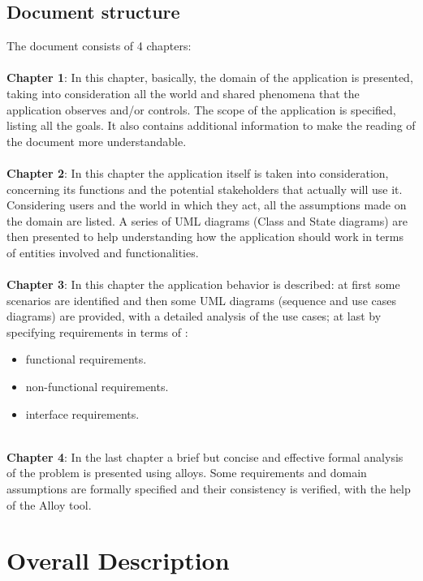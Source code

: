 \documentclass[a4paper]{report}
\begin{document}
\section{Document structure}

The document consists of 4 chapters:
\\ 
\\
\textbf{Chapter 1}: In this chapter, basically, the domain of the application is presented, taking into consideration all the world and shared phenomena that the application observes and/or controls. The scope of the application is specified, listing all the goals.
It also contains additional information to make the reading of the document more understandable.\\ \\
\textbf{Chapter 2}: In this chapter the application itself is taken into consideration, concerning its functions and the potential stakeholders that actually will use it. Considering users and the world in which they act, all the assumptions made on the domain are listed. A series of UML diagrams (Class and State diagrams) are then presented to help understanding how the application should work in terms of entities involved and functionalities.\\ \\
\textbf{Chapter 3}: 
In this chapter the application behavior is described: at first some scenarios are identified and then some UML diagrams (sequence and use cases diagrams) are provided, with a detailed analysis of the use cases; at last by specifying requirements in terms of :
\begin{itemize}
\item functional requirements.
\item non-functional requirements.
\item interface requirements.\\ \\
\end{itemize}
\textbf{Chapter 4}: In the last chapter a brief but concise and effective formal analysis of the problem is presented using alloys. Some requirements and domain assumptions are formally specified and their consistency is verified, with the help of the Alloy tool.
\\

\chapter{Overall Description}
\end{document}
